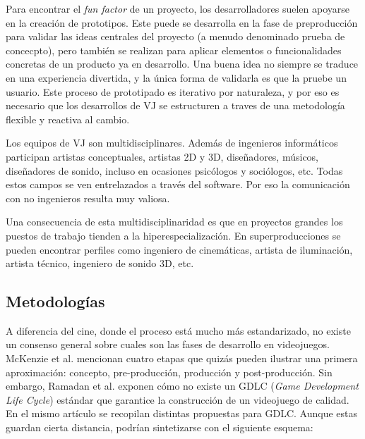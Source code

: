 Para encontrar el \textit{fun factor} de un proyecto, los desarrolladores suelen apoyarse en la creación de prototipos. Este puede se desarrolla en la fase de preproducción para validar las ideas centrales del proyecto (a menudo denominado prueba de concecpto), pero también se realizan para aplicar elementos o funcionalidades concretas de un producto ya en desarrollo. Una buena idea no siempre se traduce en una experiencia divertida, y la única forma de validarla es que la pruebe un usuario. Este proceso de prototipado es iterativo por naturaleza, y por eso es necesario que los desarrollos de VJ se estructuren a traves de una metodología flexible y reactiva al cambio. 

Los equipos de VJ son multidisciplinares. Además de ingenieros informáticos participan artistas conceptuales, artistas 2D y 3D, diseñadores, músicos, diseñadores de sonido, incluso en ocasiones psicólogos y sociólogos, etc. Todas estos campos se ven entrelazados a través del software. Por eso la comunicación con no ingenieros resulta muy valiosa.

Una consecuencia de esta multidisciplinaridad es que en proyectos grandes los puestos de trabajo tienden a la hiperespecialización. En superproducciones se pueden encontrar perfiles como ingeniero de cinemáticas, artista de iluminación, artista técnico, ingeniero de sonido 3D, etc.

\subsection{Metodologías}

A diferencia del cine, donde el proceso está mucho más estandarizado\cite{ENGSTROM201810}, no existe un consenso general sobre cuales son las fases de desarrollo en videojuegos. McKenzie et al.\cite{mckenzie} mencionan cuatro etapas que quizás pueden ilustrar una primera aproximación: concepto, pre-producción, producción y post-producción. Sin embargo, Ramadan et al.\cite{ramadan} exponen cómo no existe un GDLC (\textit{Game Development Life Cycle}) estándar que garantice la construcción de un videojuego de calidad. En el mismo artículo se recopilan distintas propuestas para GDLC. Aunque estas guardan cierta distancia, podrían sintetizarse con el siguiente esquema:

